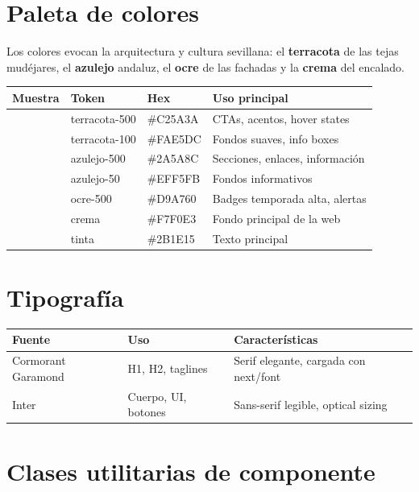 \documentclass[12pt,a4paper,twoside,openright]{report}
\begin{document}
\section{Paleta de colores}

Los colores evocan la arquitectura y cultura sevillana: el \textbf{terracota} de las
tejas mudéjares, el \textbf{azulejo} andaluz, el \textbf{ocre} de las fachadas y la
\textbf{crema} del encalado.

\begin{longtable}{C{2cm} L{2.2cm} C{3cm} L{5cm}}
  \toprule
  \textbf{Muestra} & \textbf{Token} & \textbf{Hex} & \textbf{Uso principal} \\
  \midrule
   & terracota-500 & \#C25A3A & CTAs, acentos, hover states \\
   & terracota-100 & \#FAE5DC & Fondos suaves, info boxes \\
   & azulejo-500 & \#2A5A8C & Secciones, enlaces, información \\
   & azulejo-50 & \#EFF5FB & Fondos informativos \\
   & ocre-500 & \#D9A760 & Badges temporada alta, alertas \\
   & crema & \#F7F0E3 & Fondo principal de la web \\
   & tinta & \#2B1E15 & Texto principal \\
  \bottomrule
\end{longtable}

\section{Tipografía}

\begin{longtable}{L{3cm} L{4cm} L{5.5cm}}
  \toprule
  \textbf{Fuente} & \textbf{Uso} & \textbf{Características} \\
  \midrule
  Cormorant Garamond & H1, H2, taglines & Serif elegante, cargada con next/font \\
  Inter & Cuerpo, UI, botones & Sans-serif legible, optical sizing \\
  \bottomrule
\end{longtable}

\section{Clases utilitarias de componente}
\end{document}
